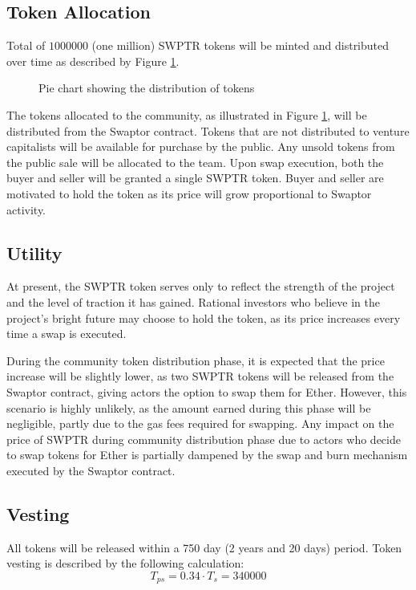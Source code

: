 \documentclass[12pt]{article}
\begin{document}
  \subsection{Token Allocation}

  Total of $1000000$ (one million) SWPTR tokens will be minted and distributed over time as described by Figure \ref{fig:pie-chart}.

  \begin{figure}[h]
    \centering
    \caption{Pie chart showing the distribution of tokens}
    \label{fig:pie-chart}
  \end{figure}

  The tokens allocated to the community, as illustrated in Figure \ref{fig:pie-chart}, will be distributed from the Swaptor contract.
  Tokens that are not distributed to venture capitalists will be available for purchase by the public. Any unsold tokens from the public sale will be allocated to the team.
  Upon swap execution, both the buyer and seller will be granted a single SWPTR token.
  Buyer and seller are motivated to hold the token as its price will grow proportional to Swaptor activity.

  \newpage

  \subsection{Utility}
  At present, the SWPTR token serves only to reflect the strength of the
  project and the level of traction it has gained. Rational investors
  who believe in the project's bright future may choose to hold the
  token, as its price increases every time a swap is executed.

  During the community token distribution phase, it is expected that
  the price increase will be slightly lower, as two SWPTR tokens will
  be released from the Swaptor contract, giving actors the option to swap
  them for Ether. However, this scenario is highly unlikely, as the
  amount earned during this phase will be negligible, partly due to
  the gas fees required for swapping. Any impact on the price of SWPTR during
  community distribution phase due to actors who decide to swap tokens
  for Ether is partially dampened by the swap and burn mechanism executed
  by the Swaptor contract.

  \subsection{Vesting}
  All tokens will be released within a 750 day (2 years and 20 days) period.
  Token vesting is described by the following calculation:
  \begin{equation}
    T_{ps} = 0.34 \cdot T_{s} = 340000
  \end{equation}
\end{document}
